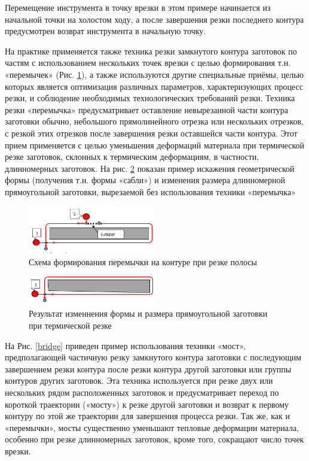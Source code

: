 \documentclass[12pt,twoside]{report}
\begin{document}
Перемещение инструмента в точку врезки
в этом примере начинается из начальной точки на холостом ходу,
а после завершения резки последнего контура
предусмотрен возврат инструмента в начальную точку.

На практике применяется также техника резки
замкнутого контура заготовок по частям
с использованием нескольких точек врезки
с целью формирования т.н. «перемычек»
(Рис. \ref{jumper}),
а также используются другие специальные приёмы,
целью которых является оптимизация различных параметров,
характеризующих процесс резки,
и соблюдение необходимых технологических требований резки.
Техника резки «перемычка» предусматривает
оставление невырезанной части контура заготовки обычно,
небольшого прямолинейного отрезка или нескольких отрезков,
с резкой этих отрезков после завершения резки оставшейся части контура.
Этот прием применяется с целью уменьшения деформаций материала
при термической резке заготовок, склонных к термическим деформациям,
в частности, длинномерных заготовок.
На рис. \ref{saber} показан пример искажения геометрической формы
(получения т.н. формы «сабли»)
и изменения размера длинномерной прямоугольной заготовки,
вырезаемой без использования техники «перемычка»

\begin{figure}
  \begin{center}
  \includegraphics[width=0.5\textwidth]{jumper.png}
  \caption{Схема формирования перемычки на контуре при резке полосы}
  \label{jumper}
  \end{center}
\end{figure}

\begin{figure}
  \begin{center}
  \includegraphics[width=0.5\textwidth]{saber.png}
  \caption{Результат изменнения формы и размера прямоугольной заготовки при термической резке}
  \label{saber}
  \end{center}
\end{figure}

На Рис. \ref{bridge}
приведен пример использования техники «мост»,
предполагающей  частичную резку замкнутого контура
заготовки с последующим завершением резки контура
после резки контура другой заготовки или
группы контуров других заготовок.
Эта техника используется при резке двух или
нескольких рядом расположенных заготовок и
предусматривает переход по короткой траектории («мосту»)
к резке другой заготовки и возврат к первому контуру
по этой же траектории для завершения процесса резки.
Так же, как и «перемычки»,
мосты существенно уменьшают тепловые деформации материала,
особенно при резке длинномерных заготовок,
кроме того, сокращают число точек врезки.
\end{document}
